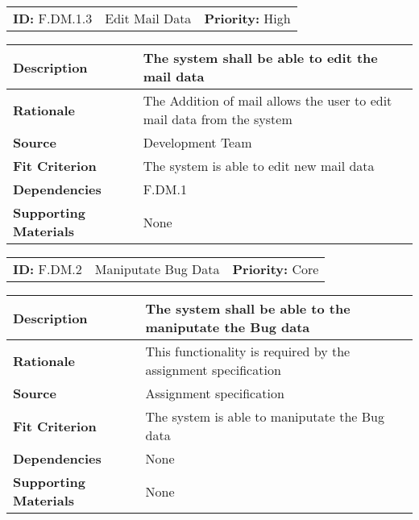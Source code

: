 \begin{table}[H]
    \begin{tabularx}{\textwidth}{| l | X | l |}
        \hline
        \textbf{ID:} F.DM.1.3 & Edit Mail Data & \textbf{Priority:} High \\
    \end{tabularx}
    \begin{tabularx}{\textwidth}{| l | X |}
        \hline
        \textbf{Description} & The system shall be able to edit the mail data \\ \hline
        \textbf{Rationale} & The Addition of mail allows the user to edit mail data from the system\\ \hline
        \textbf{Source} & Development Team\\ \hline
        \textbf{Fit Criterion} & The system is able to edit new mail data\\ \hline
        \textbf{Dependencies} & F.DM.1 \\ \hline
        \textbf{Supporting Materials} & None \\ \hline
    \end{tabularx}
\end{table}

\begin{table}[H]
    \begin{tabularx}{\textwidth}{| l | X | l |}
        \hline
        \textbf{ID:} F.DM.2 & Maniputate Bug Data & \textbf{Priority:} Core \\
    \end{tabularx}
    \begin{tabularx}{\textwidth}{| l | X |}
        \hline
        \textbf{Description} & The system shall be able to the maniputate the Bug data \\ \hline
        \textbf{Rationale} & This functionality is required by the assignment specification\\ \hline
        \textbf{Source} & Assignment specification\\ \hline
        \textbf{Fit Criterion} & The system is able to maniputate the Bug data\\ \hline
        \textbf{Dependencies} & None \\ \hline
        \textbf{Supporting Materials} & None \\ \hline
    \end{tabularx}
\end{table}

